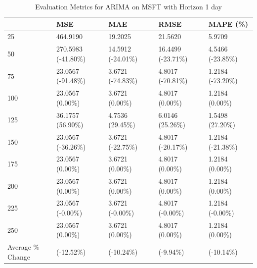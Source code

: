 \begin{table}
\caption{Evaluation Metrics for ARIMA on MSFT with Horizon 1 day}
\label{tab:arima_MSFT_h1_metrics}
\begin{tabular}{lllll}
\toprule
 & MSE & MAE & RMSE & MAPE (\%) \\
\midrule
25 & 464.9190 & 19.2025 & 21.5620 & 5.9709 \\
50 & 270.5983 (-41.80\%) & 14.5912 (-24.01\%) & 16.4499 (-23.71\%) & 4.5466 (-23.85\%) \\
75 & 23.0567 (-91.48\%) & 3.6721 (-74.83\%) & 4.8017 (-70.81\%) & 1.2184 (-73.20\%) \\
100 & 23.0567 (0.00\%) & 3.6721 (0.00\%) & 4.8017 (0.00\%) & 1.2184 (0.00\%) \\
125 & 36.1757 (56.90\%) & 4.7536 (29.45\%) & 6.0146 (25.26\%) & 1.5498 (27.20\%) \\
150 & 23.0567 (-36.26\%) & 3.6721 (-22.75\%) & 4.8017 (-20.17\%) & 1.2184 (-21.38\%) \\
175 & 23.0567 (0.00\%) & 3.6721 (0.00\%) & 4.8017 (0.00\%) & 1.2184 (0.00\%) \\
200 & 23.0567 (0.00\%) & 3.6721 (0.00\%) & 4.8017 (0.00\%) & 1.2184 (0.00\%) \\
225 & 23.0567 (-0.00\%) & 3.6721 (-0.00\%) & 4.8017 (-0.00\%) & 1.2184 (-0.00\%) \\
250 & 23.0567 (0.00\%) & 3.6721 (0.00\%) & 4.8017 (0.00\%) & 1.2184 (0.00\%) \\
Average \% Change & (-12.52\%) & (-10.24\%) & (-9.94\%) & (-10.14\%) \\
\bottomrule
\end{tabular}
\end{table}
